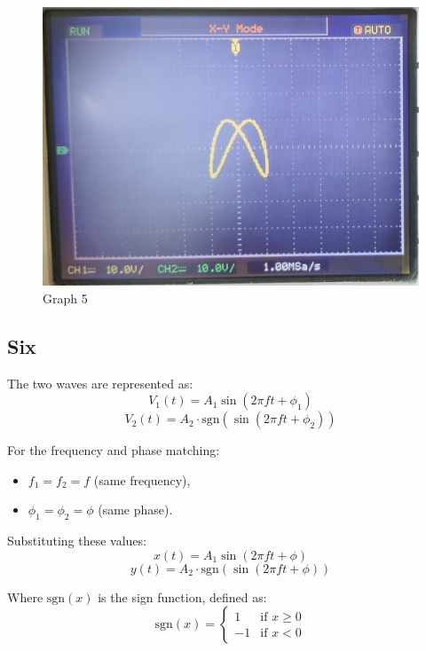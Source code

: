 \documentclass[12pt,a4paper]{report}
\begin{document}
\begin{figure}[H]
\begin{minipage}[c]{0.48\textwidth}
    \end{minipage}
    \hfill
    \begin{minipage}[c]{0.48\textwidth}
        \includegraphics[width=\textwidth]{figs/5cro.jpg} %
        
    \end{minipage}
    \caption{Graph 5}
    \label{fig:CRO-patterns}
\end{figure}
\subsection{Six}
The two waves are represented as:
\[
V_1(t) = A_1 \sin(2 \pi f t + \phi_1)
\]
\[
V_2(t) = A_2 \cdot \text{sgn}\left( \sin(2 \pi f t + \phi_2) \right)
\]

For the frequency and phase matching:
\begin{itemize}
    \item $f_1 = f_2 = f$ (same frequency),
    \item $\phi_1 = \phi_2 = \phi$ (same phase).
\end{itemize}

Substituting these values:
\[
x(t) = A_1 \sin(2 \pi f t + \phi)
\]
\[
y(t) = A_2 \cdot \text{sgn}\left( \sin(2 \pi f t + \phi) \right)
\]

Where \( \text{sgn}(x) \) is the sign function, defined as:
\[
\text{sgn}(x) = \begin{cases} 
1 & \text{if } x \geq 0 \\
-1 & \text{if } x < 0 
\end{cases}
\]
\end{document}
